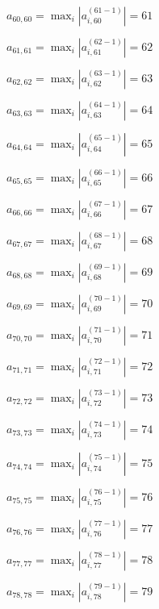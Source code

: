 \documentclass[a4paper,12pt]{article}
\begin{document}
$a _{ 60, 60 } =  \max _i |a _{ i, 60 } ^{ (61 - 1) } | = 61$

$a _{ 61, 61 } =  \max _i |a _{ i, 61 } ^{ (62 - 1) } | = 62$

$a _{ 62, 62 } =  \max _i |a _{ i, 62 } ^{ (63 - 1) } | = 63$

$a _{ 63, 63 } =  \max _i |a _{ i, 63 } ^{ (64 - 1) } | = 64$

$a _{ 64, 64 } =  \max _i |a _{ i, 64 } ^{ (65 - 1) } | = 65$

$a _{ 65, 65 } =  \max _i |a _{ i, 65 } ^{ (66 - 1) } | = 66$

$a _{ 66, 66 } =  \max _i |a _{ i, 66 } ^{ (67 - 1) } | = 67$

$a _{ 67, 67 } =  \max _i |a _{ i, 67 } ^{ (68 - 1) } | = 68$

$a _{ 68, 68 } =  \max _i |a _{ i, 68 } ^{ (69 - 1) } | = 69$

$a _{ 69, 69 } =  \max _i |a _{ i, 69 } ^{ (70 - 1) } | = 70$

$a _{ 70, 70 } =  \max _i |a _{ i, 70 } ^{ (71 - 1) } | = 71$

$a _{ 71, 71 } =  \max _i |a _{ i, 71 } ^{ (72 - 1) } | = 72$

$a _{ 72, 72 } =  \max _i |a _{ i, 72 } ^{ (73 - 1) } | = 73$

$a _{ 73, 73 } =  \max _i |a _{ i, 73 } ^{ (74 - 1) } | = 74$

$a _{ 74, 74 } =  \max _i |a _{ i, 74 } ^{ (75 - 1) } | = 75$

$a _{ 75, 75 } =  \max _i |a _{ i, 75 } ^{ (76 - 1) } | = 76$

$a _{ 76, 76 } =  \max _i |a _{ i, 76 } ^{ (77 - 1) } | = 77$

$a _{ 77, 77 } =  \max _i |a _{ i, 77 } ^{ (78 - 1) } | = 78$

$a _{ 78, 78 } =  \max _i |a _{ i, 78 } ^{ (79 - 1) } | = 79$
\end{document}
